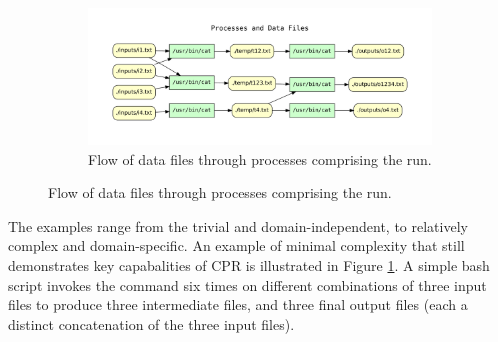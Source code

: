 \begin{figure}[h!]
\begin{subfigure}[b]{1.0\linewidth}
    \end{subfigure}

    \begin{subfigure}[b]{1.0\linewidth}
        \includegraphics[width=\linewidth]{cpr_processes_and_data_files.pdf}
        \setlength{\abovecaptionskip}{-5pt}
        \caption{Flow of data files through processes comprising the run.}
    \end{subfigure}
    
    \label{fig:cpr-example}
\end{figure}
 

The examples range from the trivial and domain-independent, to relatively complex and domain-specific.  An example of minimal complexity that still demonstrates key capabalities of CPR is illustrated in Figure \ref{fig:cpr-example}. A simple bash script invokes the  command six times on different combinations of three input files to produce three intermediate files, and three final output files (each a distinct concatenation of the three input files).  
